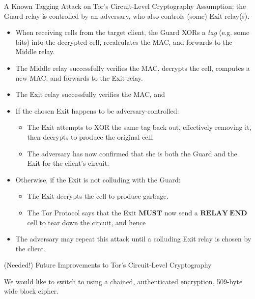 \documentclass[9pt,a4paper]{beamer}
\begin{document}
\begin{frame}{A Known Tagging Attack on Tor's Circuit-Level Cryptography}
  Assumption: the Guard relay is controlled by an adversary, who also controls (some) Exit relay(s).

  \begin{itemize}
    \item<2-> When receiving cells from the target client, the Guard XORs a \emph{tag} (e.g. some
      bits) into the decrypted cell, recalculates the MAC, and forwards to the Middle relay.
    \item<3-> The Middle relay successfully verifies the MAC, decrypts the cell, computes a new
      MAC, and forwards to the Exit relay.
    \item<4-> The Exit relay successfully verifies the MAC, and
    \item<5-> If the chosen Exit happens to be adversary-controlled:
      \begin{itemize}
      \item<6-> The Exit attempts to XOR the same tag back out, effectively removing it, then
        decrypts to produce the original cell.
      \item<7-> The adversary has now confirmed that she is both the Guard and the Exit for the
        client's circuit.
      \end{itemize}
    \item<8-> Otherwise, if the Exit is not colluding with the Guard:
      \begin{itemize}
      \item<9-> The Exit decrypts the cell to produce garbage.
      \item<10-> The Tor Protocol says that the Exit $\mathbf{MUST}$ now send a
        $\mathbf{RELAY\:END}$ cell to tear down the circuit, and hence
      \end{itemize}
      \item<11-> The adversary may repeat this attack until a colluding Exit relay is chosen
        by the client.
    \end{itemize}
\end{frame}

\begin{frame}{(Needed!) Future Improvements to Tor's Circuit-Level Cryptography}

  We would like to switch to using a chained, authenticated encryption, 509-byte wide block cipher.


\end{frame}
\end{document}
